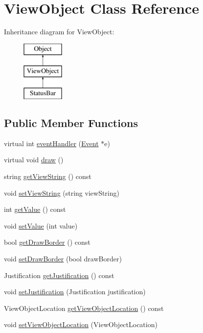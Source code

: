 \hypertarget{class_view_object}{\section{View\+Object Class Reference}
\label{class_view_object}
}
Inheritance diagram for View\+Object\+:\begin{figure}[H]
\begin{center}
\leavevmode
\includegraphics[height=3.000000cm]{class_view_object}
\end{center}
\end{figure}
\subsection*{Public Member Functions}
\begin{DoxyCompactItemize}
\item 
virtual int \hyperlink{class_view_object_aae06f1481afddf829a97b045a0c60bb7}{event\+Handler} (\hyperlink{class_event}{Event} $\ast$e)
\item 
virtual void \hyperlink{class_view_object_aae76e90e25d65e34d80e468b41af95da}{draw} ()
\item 
string \hyperlink{class_view_object_aca2716919c8e5cad80898a7f9962ddcc}{get\+View\+String} () const 
\item 
void \hyperlink{class_view_object_adae1f08a437032a52db37a6b7e84d046}{set\+View\+String} (string view\+String)
\item 
int \hyperlink{class_view_object_a87877b05cb9a8d44a77dc173b7738d62}{get\+Value} () const 
\item 
void \hyperlink{class_view_object_a7b6c99fea863c7eac45cbe8fcff03d96}{set\+Value} (int value)
\item 
bool \hyperlink{class_view_object_a2ba768ed1d2301a8cc06531854462078}{get\+Draw\+Border} () const 
\item 
void \hyperlink{class_view_object_a19e870c7720b8174e8293a8287d111a2}{set\+Draw\+Border} (bool draw\+Border)
\item 
Justification \hyperlink{class_view_object_a02a8ccd6e642e1f3274f1c8523c992d4}{get\+Justification} () const 
\item 
void \hyperlink{class_view_object_a48b915f41e561fd210ea5e22d690aa10}{set\+Justification} (Justification justification)
\item 
View\+Object\+Location \hyperlink{class_view_object_ac0672505b7a72ec0a4be8f261bcffe5c}{get\+View\+Object\+Location} () const 
\item 
void \hyperlink{class_view_object_a2a3ae5cb263ecc0597d1b0cc85c0300e}{set\+View\+Object\+Location} (View\+Object\+Location)
\end{DoxyCompactItemize}
